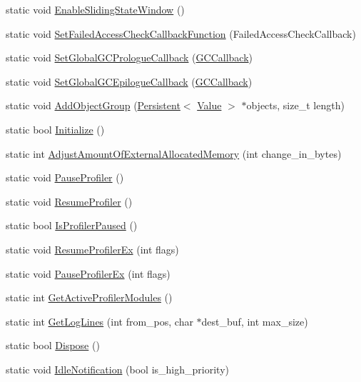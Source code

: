 \begin{DoxyCompactItemize}
\item 
static void \hyperlink{classv8_1_1_v8_aa91df5fe1bb98b87952ef4bbf0aceb96}{Enable\+Sliding\+State\+Window} ()
\item 
static void \hyperlink{classv8_1_1_v8_aa6ed646d43360c209881871b3ac747aa}{Set\+Failed\+Access\+Check\+Callback\+Function} (Failed\+Access\+Check\+Callback)
\item 
static void \hyperlink{classv8_1_1_v8_a503e14a77e922775bd88bc2e19e19886}{Set\+Global\+G\+C\+Prologue\+Callback} (\hyperlink{namespacev8_a226458957ce3c253b9a9f539bb5ddad4}{G\+C\+Callback})
\item 
static void \hyperlink{classv8_1_1_v8_a94bac5e06a99141c5629842e18558cfe}{Set\+Global\+G\+C\+Epilogue\+Callback} (\hyperlink{namespacev8_a226458957ce3c253b9a9f539bb5ddad4}{G\+C\+Callback})
\item 
static void \hyperlink{classv8_1_1_v8_a4744037e970e3b3bafcc3cac03a5967f}{Add\+Object\+Group} (\hyperlink{classv8_1_1_persistent}{Persistent}$<$ \hyperlink{classv8_1_1_value}{Value} $>$ $\ast$objects, size\+\_\+t length)
\item 
static bool \hyperlink{classv8_1_1_v8_a40daec93ce44bdd922567fc121be9db8}{Initialize} ()
\item 
static int \hyperlink{classv8_1_1_v8_a8e6f2e66c028d1ffa3f5e8a799790bc5}{Adjust\+Amount\+Of\+External\+Allocated\+Memory} (int change\+\_\+in\+\_\+bytes)
\item 
static void \hyperlink{classv8_1_1_v8_a5fefebea0cd37105837a9d267baf2e5c}{Pause\+Profiler} ()
\item 
static void \hyperlink{classv8_1_1_v8_ab0557aaba62c7fb253fe838003aa60af}{Resume\+Profiler} ()
\item 
static bool \hyperlink{classv8_1_1_v8_aa8dc5a7c3a059bb376882ac36b9df775}{Is\+Profiler\+Paused} ()
\item 
static void \hyperlink{classv8_1_1_v8_aac4620dd3e4f14dc4683f4cfe3076338}{Resume\+Profiler\+Ex} (int flags)
\item 
static void \hyperlink{classv8_1_1_v8_aca6135fcc429cd8340630a95e08f223a}{Pause\+Profiler\+Ex} (int flags)
\item 
static int \hyperlink{classv8_1_1_v8_a94e8ce52e976b58d5cbdb23d2abe894e}{Get\+Active\+Profiler\+Modules} ()
\item 
static int \hyperlink{classv8_1_1_v8_ac7e91e25ed7773db1f31413fb726bca7}{Get\+Log\+Lines} (int from\+\_\+pos, char $\ast$dest\+\_\+buf, int max\+\_\+size)
\item 
static bool \hyperlink{classv8_1_1_v8_a566450d632c0a63770682b9da3cae08d}{Dispose} ()
\item 
static void \hyperlink{classv8_1_1_v8_a270bf9aa42b6f7dad1a685f2d7309289}{Idle\+Notification} (bool is\+\_\+high\+\_\+priority)
\end{DoxyCompactItemize}

